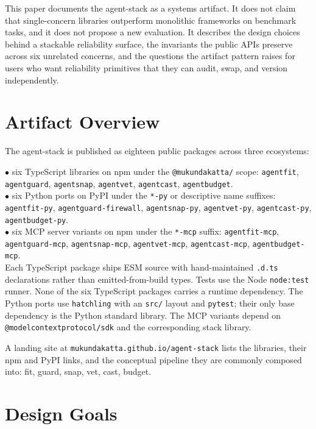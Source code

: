\documentclass[11pt]{article}
\begin{document}
This paper documents the agent-stack as a systems artifact. It does not claim that single-concern libraries outperform monolithic frameworks on benchmark tasks, and it does not propose a new evaluation. It describes the design choices behind a stackable reliability surface, the invariants the public APIs preserve across six unrelated concerns, and the questions the artifact pattern raises for users who want reliability primitives that they can audit, swap, and version independently.

\section{Artifact Overview}


The agent-stack is published as eighteen public packages across three ecosystems:

\noindent $\bullet$ six TypeScript libraries on npm under the \texttt{@mukundakatta/} scope: \texttt{agentfit}, \texttt{agentguard}, \texttt{agentsnap}, \texttt{agentvet}, \texttt{agentcast}, \texttt{agentbudget}.\\
\noindent $\bullet$ six Python ports on PyPI under the \texttt{*-py} or descriptive name suffixes: \texttt{agentfit-py}, \texttt{agentguard-firewall}, \texttt{agentsnap-py}, \texttt{agentvet-py}, \texttt{agentcast-py}, \texttt{agentbudget-py}.\\
\noindent $\bullet$ six MCP server variants on npm under the \texttt{*-mcp} suffix: \texttt{agentfit-mcp}, \texttt{agentguard-mcp}, \texttt{agentsnap-mcp}, \texttt{agentvet-mcp}, \texttt{agentcast-mcp}, \texttt{agentbudget-mcp}.\\


Each TypeScript package ships ESM source with hand-maintained \texttt{.d.ts} declarations rather than emitted-from-build types. Tests use the Node \texttt{node:test} runner. None of the six TypeScript packages carries a runtime dependency. The Python ports use \texttt{hatchling} with an \texttt{src/} layout and \texttt{pytest}; their only base dependency is the Python standard library. The MCP variants depend on \texttt{@modelcontextprotocol/sdk} and the corresponding stack library.

A landing site at \texttt{mukundakatta.github.io/agent-stack} lists the libraries, their npm and PyPI links, and the conceptual pipeline they are commonly composed into: fit, guard, snap, vet, cast, budget.

\section{Design Goals}
\end{document}

